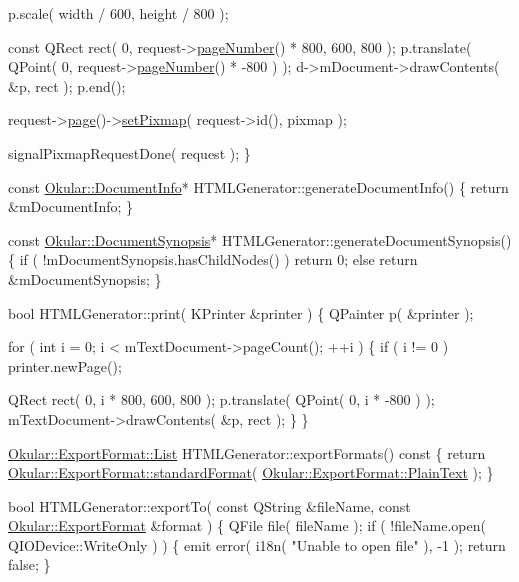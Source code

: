 \begin{DoxyCode}
    p.scale( width / 600, height / 800 );

    \textcolor{keyword}{const} QRect rect( 0, request->\hyperlink{classOkular_1_1PixmapRequest_a50f959175182137dbb9e2dbd6ddd71aa}{pageNumber}() * 800, 600, 800 );
    p.translate( QPoint( 0, request->\hyperlink{classOkular_1_1PixmapRequest_a50f959175182137dbb9e2dbd6ddd71aa}{pageNumber}() * -800 ) );
    d->mDocument->drawContents( &p, rect );
    p.end();

    request->\hyperlink{classOkular_1_1PixmapRequest_a83b5e81f2e908e70f3c19a0a3c07fab3}{page}()->\hyperlink{classOkular_1_1Page_ae7e45a6647904b01ebe84930b73f1d79}{setPixmap}( request->id(), pixmap );

    signalPixmapRequestDone( request );
\}

\textcolor{keyword}{const} \hyperlink{classOkular_1_1DocumentInfo}{Okular::DocumentInfo}* HTMLGenerator::generateDocumentInfo()
\{
    \textcolor{keywordflow}{return} &mDocumentInfo;
\}

\textcolor{keyword}{const} \hyperlink{classOkular_1_1DocumentSynopsis}{Okular::DocumentSynopsis}* HTMLGenerator::generateDocumentSynopsis()
\{
    \textcolor{keywordflow}{if} ( !mDocumentSynopsis.hasChildNodes() )
        \textcolor{keywordflow}{return} 0;
    \textcolor{keywordflow}{else}
        \textcolor{keywordflow}{return} &mDocumentSynopsis;
\}

\textcolor{keywordtype}{bool} HTMLGenerator::print( KPrinter &printer )
\{
    QPainter p( &printer );

    \textcolor{keywordflow}{for} ( \textcolor{keywordtype}{int} i = 0; i < mTextDocument->pageCount(); ++i ) \{
        \textcolor{keywordflow}{if} ( i != 0 )
            printer.newPage();

        QRect rect( 0, i * 800, 600, 800 );
        p.translate( QPoint( 0, i * -800 ) );
        mTextDocument->drawContents( &p, rect );
    \}
\}

\hyperlink{classQList}{Okular::ExportFormat::List} HTMLGenerator::exportFormats()\textcolor{keyword}{ const}
\textcolor{keyword}{}\{
    \textcolor{keywordflow}{return} \hyperlink{classOkular_1_1ExportFormat_a5a403d349fe023513836471a18f55ced}{Okular::ExportFormat::standardFormat}( 
      \hyperlink{classOkular_1_1ExportFormat_af030ecc6c77b5cdd89cd1bc4a894c6f2ad7daf23a3915d800df9de1b417a4b65a}{Okular::ExportFormat::PlainText} );
\}

\textcolor{keywordtype}{bool} HTMLGenerator::exportTo( \textcolor{keyword}{const} QString &fileName, \textcolor{keyword}{const} 
      \hyperlink{classOkular_1_1ExportFormat}{Okular::ExportFormat} &format )
\{
    QFile file( fileName );
    \textcolor{keywordflow}{if} ( !fileName.open( QIODevice::WriteOnly ) ) \{
        emit error( i18n( \textcolor{stringliteral}{"Unable to open file"} ), -1 );
        \textcolor{keywordflow}{return} \textcolor{keyword}{false};
    \}


\end{DoxyCode}
